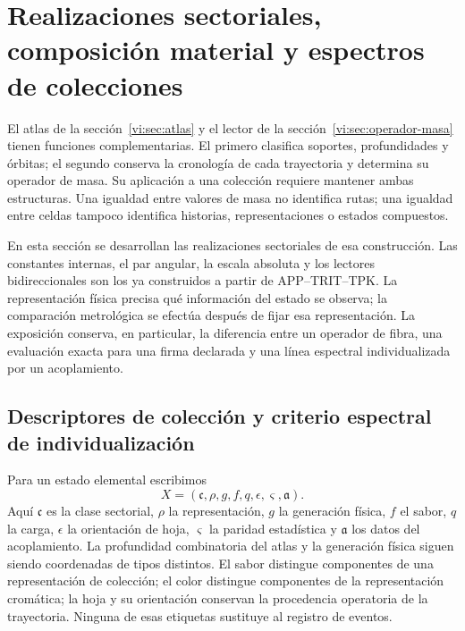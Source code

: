 \section{Realizaciones sectoriales, composición material y espectros de colecciones}
\label{vi:sec:familias-compuestos}

El atlas de la sección~\ref{vi:sec:atlas} y el lector de la
sección~\ref{vi:sec:operador-masa} tienen funciones complementarias. El
primero clasifica soportes, profundidades y órbitas; el segundo conserva la
cronología de cada trayectoria y determina su operador de masa. Su aplicación
a una colección requiere mantener ambas estructuras. Una igualdad entre
valores de masa no identifica rutas; una igualdad entre celdas tampoco
identifica historias, representaciones o estados compuestos.

En esta sección se desarrollan las realizaciones sectoriales de esa
construcción. Las constantes internas, el par angular, la escala absoluta
y los lectores bidireccionales son los ya construidos a partir de
APP--TRIT--TPK. La representación física precisa qué información del
estado se observa; la comparación metrológica se efectúa después de fijar
esa representación. La exposición conserva, en particular, la diferencia
entre un operador de fibra, una evaluación exacta para una firma declarada
y una línea espectral individualizada por un acoplamiento.

\subsection{Descriptores de colección y criterio espectral de individualización}
\label{vi:subsec:descriptor-familia}

Para un estado elemental escribimos
\[
 X=(\mathfrak c,\rho,g,f,q,\epsilon,\varsigma,\mathfrak a).
\]
Aquí \(\mathfrak c\) es la clase sectorial, \(\rho\) la representación,
\(g\) la generación física, \(f\) el sabor, \(q\) la carga,
\(\epsilon\) la orientación de hoja, \(\varsigma\) la paridad estadística
y \(\mathfrak a\) los datos del acoplamiento. La profundidad combinatoria
del atlas y la generación física siguen siendo coordenadas de tipos
distintos. El sabor distingue componentes de una representación de
colección; el color distingue componentes de la representación cromática;
la hoja y su orientación conservan la procedencia operatoria de la
trayectoria. Ninguna de esas etiquetas sustituye al registro de eventos.

